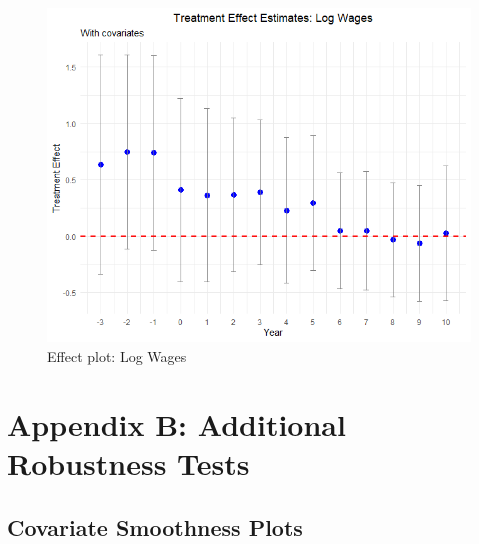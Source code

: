 \begin{figure}[htbp]
    \centering
    \includegraphics[width=\textwidth,keepaspectratio]{images/tes_ln_wages.png}
    \caption{Effect plot: Log Wages}
    \label{fig:tes_ln_wages}
\end{figure}


\clearpage

\section{Appendix B: Additional Robustness Tests} \label{sec:appxb}

\subsection{Covariate Smoothness Plots}

